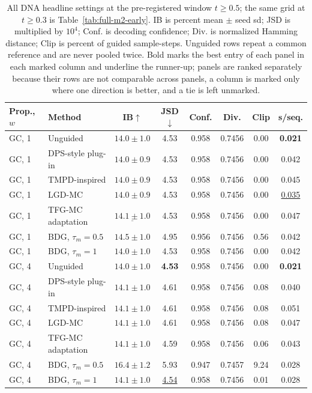\documentclass{article}
\begin{document}
\begin{table}[!htbp]
\centering\small
\caption{All DNA headline settings at the pre-registered window $t\ge0.5$; the same grid at $t\ge0.3$ is Table~\ref{tab:full-m2-early}. IB is percent mean $\pm$ seed sd; JSD is multiplied by $10^4$; Conf. is decoding confidence; Div. is normalized Hamming distance; Clip is percent of guided sample-steps. Unguided rows repeat a common reference and are never pooled twice. Bold marks the best entry of each panel in each marked column and underline the runner-up; panels are ranked separately because their rows are not comparable across panels, a column is marked only where one direction is better, and a tie is left unmarked.}
\label{tab:full-m2}
\begin{tabular}{llcccccc}
\toprule
Prop., $w$ & Method & IB$\uparrow$ & JSD$\downarrow$ & Conf. & Div. & Clip & s/seq.\\
\midrule
GC, 1 & Unguided & $14.0\pm1.0$ & 4.53 & 0.958 & 0.7456 & 0.00 & \textbf{0.021}\\
GC, 1 & DPS-style plug-in & $14.0\pm0.9$ & 4.53 & 0.958 & 0.7456 & 0.00 & 0.042\\
GC, 1 & TMPD-inspired & $14.0\pm0.9$ & 4.53 & 0.958 & 0.7456 & 0.00 & 0.045\\
GC, 1 & LGD-MC & $14.0\pm0.9$ & 4.53 & 0.958 & 0.7456 & 0.00 & \underline{0.035}\\
GC, 1 & TFG-MC adaptation & $\underline{14.1\pm1.0}$& 4.53 & 0.958 & 0.7456 & 0.00 & 0.047\\
GC, 1 & BDG, $\tau_m=0.5$ & $\mathbf{14.5\pm1.0}$& 4.95 & 0.956 & 0.7456 & 0.56 & 0.042\\
GC, 1 & BDG, $\tau_m=1$ & $14.0\pm1.0$ & 4.53 & 0.958 & 0.7456 & 0.00 & 0.042\\
\midrule
GC, 4 & Unguided & $14.0\pm1.0$ & \textbf{4.53}& 0.958 & 0.7456 & 0.00 & \textbf{0.021}\\
GC, 4 & DPS-style plug-in & $14.1\pm1.0$ & 4.61 & 0.958 & 0.7456 & 0.08 & 0.040\\
GC, 4 & TMPD-inspired & $14.1\pm1.0$ & 4.61 & 0.958 & 0.7456 & 0.08 & 0.051\\
GC, 4 & LGD-MC & $14.1\pm1.0$ & 4.61 & 0.958 & 0.7456 & 0.08 & 0.047\\
GC, 4 & TFG-MC adaptation & $14.1\pm1.0$ & 4.59 & 0.958 & 0.7456 & 0.06 & 0.043\\
GC, 4 & BDG, $\tau_m=0.5$ & $\mathbf{16.4\pm1.2}$& 5.93 & 0.947 & 0.7457 & 9.24 & 0.028\\
GC, 4 & BDG, $\tau_m=1$ & $14.1\pm1.0$ & \underline{4.54}& 0.958 & 0.7456 & 0.01 & 0.028\\

\end{tabular}
\end{table}
\end{document}
